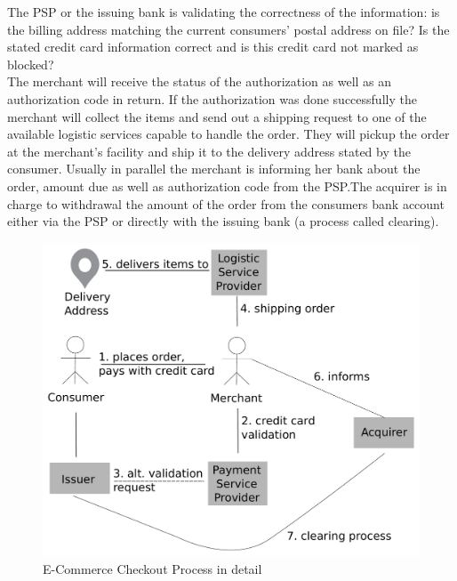 The PSP or the issuing bank is validating the correctness of the information: is the billing address matching the current consumers' postal address on file? Is the stated credit card information correct and is this credit card not marked as blocked? \\
The merchant will receive the status of the authorization as well as an authorization code in return. If the authorization was done successfully the merchant will collect the items and send out a shipping request to one of the available logistic services capable to handle the order. They will pickup the order at the merchant's facility and ship it to the delivery address stated by the consumer. Usually in parallel the merchant is informing her bank about the order, amount due as well as authorization code from the PSP.\@ The acquirer is in charge to withdrawal the amount of the order from the consumers bank account either via the PSP or directly with the issuing bank (a process called clearing).\@

\begin{figure}[H]
	\centering
		\includegraphics[width=0.8\columnwidth]{images/e-commerce-checkout-process.pdf}
	\caption{E-Commerce Checkout Process in detail}
\label{fig:images_ecommerce_checkout_process}
\end{figure}

